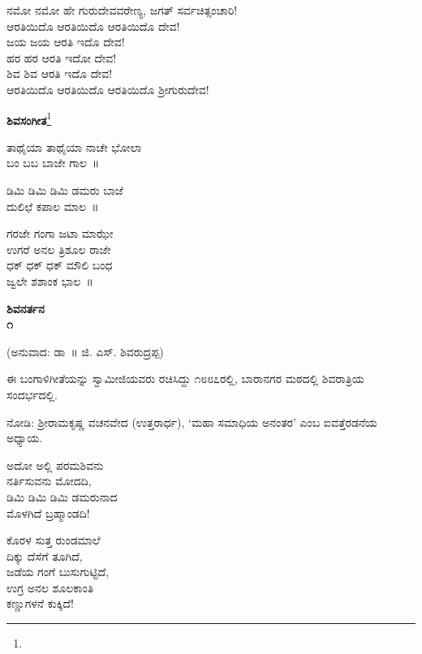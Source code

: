 \begin{myquote}
ನಮೋ ನಮೋ ಹೇ ಗುರುದೇವವರೇಣ್ಯ, ಜಗತ್ ಸರ್ವಚಿತ್ಸಂಚಾರಿ!\\ಆರತಿಯಿದೊ ಆರತಿಯಿದೊ ಆರತಿಯಿದೊ ದೇವ!\\ಜಯ ಜಯ ಆರತಿ ಇದೊ ದೇವ!\\ಹರ ಹರ ಆರತಿ ಇದೋ ದೇವ!\\ಶಿವ ಶಿವ ಆರತಿ ಇದೊ ದೇವ!\\ಆರತಿಯಿದೊ ಆರತಿಯಿದೊ ಆರತಿಯಿದೊ ಶ‍್ರೀಗುರುದೇವ!
\end{myquote}

\begin{center}
\textbf{ಶಿವಸಂಗೀತ}\footnote{}
\end{center}

\begin{myquote}
ತಾಥೈಯಾ ತಾಥೈಯಾ ನಾಚೇ ಭೋಲಾ\\ಬಂ ಬಬ ಬಾಜೇ ಗಾಲ~॥
\end{myquote}

\begin{myquote}
ಡಿಮಿ ಡಿಮಿ ಡಿಮಿ ಡಮರು ಬಾಜೆ\\ದುಲಿಛೆ ಕಪಾಲ ಮಾಲ~॥
\end{myquote}

\begin{myquote}
ಗರಜೇ ಗಂಗಾ ಜಟಾ ಮಾಝೇ\\ಉಗರೆ ಅನಲ ತ್ರಿಶೂಲ ರಾಜೇ\\ಧಕ್ ಧಕ್ ಧಕ್ ಮೌಲಿ ಬಂಧ\\ಜ್ವಲೇ ಶಶಾಂಕ ಭಾಲ~॥
\end{myquote}

\begin{center}
\textbf{ಶಿವನರ್ತನ\\೧}
\end{center}

\begin{center}
(ಅನುವಾದ: ಡಾ~॥ ಜಿ. ಎಸ್. ಶಿವರುದ್ರಪ್ಪ)
\end{center}

ಈ ಬಂಗಾಳಿಗೀತೆಯನ್ನು ಸ್ವಾಮೀಜಿಯವರು ರಚಿಸಿದ್ದು ೧೮೮೭ರಲ್ಲಿ, ಬಾರಾನಗರ ಮಠದಲ್ಲಿ ಶಿವರಾತ್ರಿಯ ಸಂದರ್ಭದಲ್ಲಿ.

ನೋಡಿ: ಶ‍್ರೀರಾಮಕೃಷ್ಣ ವಚನವೇದ (ಉತ್ತರಾರ್ಧ), ‘ಮಹಾ ಸಮಾಧಿಯ ಅನಂತರ’ ಎಂಬ ಐವತ್ತೆರಡನೆಯ ಅಧ್ಯಾಯ.

\begin{myquote}
ಅದೋ ಅಲ್ಲಿ ಪರಮಶಿವನು\\ನರ್ತಿಸುವನು ಮೋದದಿ,\\ಡಿಮಿ ಡಿಮಿ ಡಿಮಿ ಡಮರುನಾದ\\ಮೊಳಗಿದೆ ಬ್ರಹ್ಮಾಂಡದಿ!
\end{myquote}

\begin{myquote}
ಕೊರಳ ಸುತ್ತ ರುಂಡಮಾಲೆ\\ದಿಕ್ಕು ದೆಸೆಗೆ ತೂಗಿದೆ,\\ಜಡೆಯ ಗಂಗೆ ಬುಸುಗುಟ್ಟಿದೆ,\\ಉಗ್ರ ಅನಲ ಶೂಲಕಾಂತಿ\\ಕಣ್ಣುಗಳನೆ ಕುಕ್ಕಿದೆ!
\end{myquote}

